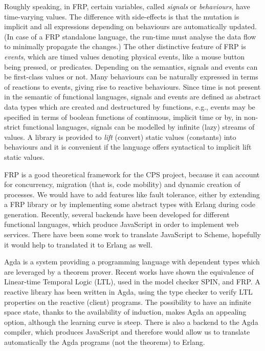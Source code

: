 \documentclass[a4paper,11pt,twoside]{article}
\newcommand\SPIN{\textsf{SPIN}\xspace}
\newcommand\Erlang{\textsf{Erlang}\xspace}
\newcommand\Agda{\textsf{Agda}\xspace}
\newcommand\JavaScript{\textsf{JavaScript}\xspace}
\newcommand\Scheme{\textsf{Scheme}\xspace}
\begin{document}
Roughly speaking, in FRP, certain variables, called \emph{signals} or
\emph{behaviours}, have time\hyp{}varying values. The difference with
side\hyp{}effects is that the mutation is implicit and all expressions
depending on behaviours are automatically updated. (In case of a FRP
standalone language, the run\hyp{}time must analyse the data flow to
minimally propagate the changes.) The other distinctive feature of FRP
is \emph{events}, which are timed values denoting physical events,
like a mouse button being pressed, or predicates. Depending on the
semantics, signals and events can be first\hyp{}class values or
not. Many behaviours can be naturally expressed in terms of reactions
to events, giving rise to reactive behaviours. Since time is not
present in the semantic of functional languages, signals and events
are defined as abstract data types which are created and destructured
by functions, e.g., events may be specified in terms of boolean
functions of continuous, implicit time or by, in non\hyp{}strict
functional languages, signals can be modelled by infinite (lazy)
streams of values. A library is provided to \emph{lift} (convert)
static values (constants) into behaviours and it is convenient if the
language offers syntactical to implicit lift static values.

FRP is a good theoretical framework for the CPS project, because it
can account for concurrency, migration (that is, code mobility) and
dynamic creation of processes. We would have to add features like
fault tolerance, either by extending a FRP library or by implementing
some abstract types with \Erlang during code generation. Recently,
several backends have been developed for different functional
languages, which produce \JavaScript in order to implement web
services. There have been some work to translate \JavaScript to
\Scheme, hopefully it would help to translated it to \Erlang as well.

\Agda is a system providing a programming language with dependent
types which are leveraged by a theorem prover. Recent works have shown
the equivalence of Linear-time Temporal Logic (LTL), used in the model
checker \SPIN, and FRP. A reactive library has been written in \Agda,
using the type checker to verify LTL properties on the reactive
(client) programs. The possibility to have an infinite space state,
thanks to the availability of induction, makes \Agda an appealing
option, although the learning curve is steep. There is also a backend
to the \Agda compiler, which produces \JavaScript and therefore would
allow us to translate automatically the \Agda programs (not the
theorems) to \Erlang.

%
%
\printbibliography
\nocite{*}
\end{document}
